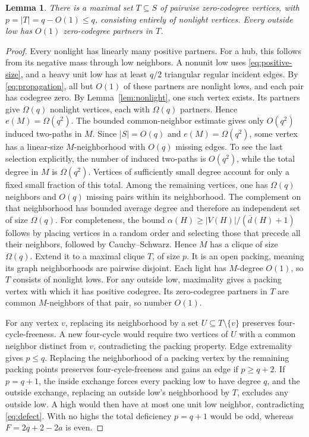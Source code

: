 \documentclass[11pt,reqno]{amsart}
\newtheorem{lemma}[theorem]{Lemma}
\theoremstyle{definition}
\theoremstyle{remark}
\numberwithin{equation}{section}
\begin{document}
\begin{lemma}\label{lem:packing}
There is a maximal set \(T\subseteq S\) of pairwise zero-codegree
vertices, with \(p=|T|=q-O(1)\le q\), consisting entirely of nonlight
vertices. Every outside low has \(O(1)\) zero-codegree partners in \(T\).
\end{lemma}
\begin{proof}
Every nonlight has linearly many positive partners. For a hub, this follows from its negative mass through low neighbors. A nonunit low uses \eqref{eq:positive-size}, and a heavy unit low has at least \(q/2\) triangular regular incident edges. By \eqref{eq:propagation}, all but \(O(1)\) of these partners are nonlight lows, and each pair has codegree zero. By Lemma~\ref{lem:nonlight}, one such vertex exists. Its partners give \(\Omega(q)\) nonlight vertices, each with \(\Omega(q)\) partners. Hence \(e(M)=\Omega(q^2)\). The bounded common-neighbor estimate gives only \(O(q^2)\) induced two-paths in \(M\). Since \(|S|=O(q)\) and \(e(M)=\Omega(q^2)\), some vertex has a linear-size \(M\)-neighborhood with \(O(q)\) missing edges. To see the last selection explicitly, the number of induced
two-paths is \(O(q^2)\), while the total degree in \(M\) is
\(\Omega(q^2)\). Vertices of sufficiently small degree account for
only a fixed small fraction of this total. Among the remaining vertices,
one has \(\Omega(q)\) neighbors and \(O(q)\) missing pairs within
its neighborhood. The complement on that neighborhood has bounded
average degree and therefore an independent set of size \(\Omega(q)\).
For completeness, the bound \(\alpha(H)\ge |V(H)|/(\overline d(H)+1)\)
follows by placing vertices in a random order and selecting those that
precede all their neighbors, followed by Cauchy--Schwarz. Hence \(M\) has a clique of size \(\Omega(q)\). Extend it to a maximal clique \(T\), of size \(p\). It is an open packing, meaning its graph neighborhoods are pairwise disjoint. Each light has \(M\)-degree \(O(1)\), so \(T\) consists of nonlight lows. For any outside low, maximality gives a packing vertex with which it has positive codegree. Its zero-codegree partners in \(T\) are common \(M\)-neighbors of that pair, so number \(O(1)\).

For any vertex \(v\), replacing its neighborhood by a set
\(U\subseteq T\setminus\{v\}\) preserves four-cycle-freeness.
A new four-cycle would require two vertices of \(U\) with a common
neighbor distinct from \(v\), contradicting the packing property.
Edge extremality gives \(p\le q\). Replacing the neighborhood of a packing vertex by the remaining packing points preserves four-cycle-freeness and gains an edge if \(p\ge q+2\). If \(p=q+1\), the inside exchange forces every packing low to have degree \(q\), and the outside exchange, replacing an outside low's neighborhood by \(T\), excludes any outside low. A high would then have at most one unit low neighbor, contradicting \eqref{eq:defect}. With no highs the total deficiency \(p=q+1\) would be odd, whereas \(F=2q+2-2a\) is even.


\end{proof}
\end{document}
